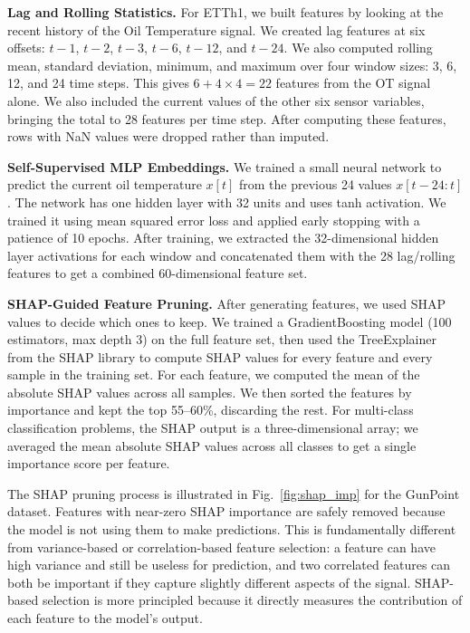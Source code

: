 \documentclass[10pt,conference]{IEEEtran}
\begin{document}
\textbf{Lag and Rolling Statistics.} For ETTh1, we built features by looking at the recent history of the Oil Temperature signal. We created lag features at six offsets: $t-1$, $t-2$, $t-3$, $t-6$, $t-12$, and $t-24$. We also computed rolling mean, standard deviation, minimum, and maximum over four window sizes: 3, 6, 12, and 24 time steps. This gives $6 + 4 \times 4 = 22$ features from the OT signal alone. We also included the current values of the other six sensor variables, bringing the total to 28 features per time step. After computing these features, rows with NaN values were dropped rather than imputed.

\textbf{Self-Supervised MLP Embeddings.} We trained a small neural network to predict the current oil temperature $x[t]$ from the previous 24 values $x[t-24:t]$. The network has one hidden layer with 32 units and uses tanh activation. We trained it using mean squared error loss and applied early stopping with a patience of 10 epochs. After training, we extracted the 32-dimensional hidden layer activations for each window and concatenated them with the 28 lag/rolling features to get a combined 60-dimensional feature set.

\textbf{SHAP-Guided Feature Pruning.} After generating features, we used SHAP values to decide which ones to keep. We trained a GradientBoosting model (100 estimators, max depth 3) on the full feature set, then used the TreeExplainer from the SHAP library \cite{autofe_xai} to compute SHAP values for every feature and every sample in the training set. For each feature, we computed the mean of the absolute SHAP values across all samples. We then sorted the features by importance and kept the top 55--60\%, discarding the rest. For multi-class classification problems, the SHAP output is a three-dimensional array; we averaged the mean absolute SHAP values across all classes to get a single importance score per feature.

The SHAP pruning process is illustrated in Fig.~\ref{fig:shap_imp} for the GunPoint dataset. Features with near-zero SHAP importance are safely removed because the model is not using them to make predictions. This is fundamentally different from variance-based or correlation-based feature selection: a feature can have high variance and still be useless for prediction, and two correlated features can both be important if they capture slightly different aspects of the signal. SHAP-based selection is more principled because it directly measures the contribution of each feature to the model's output.
\end{document}
